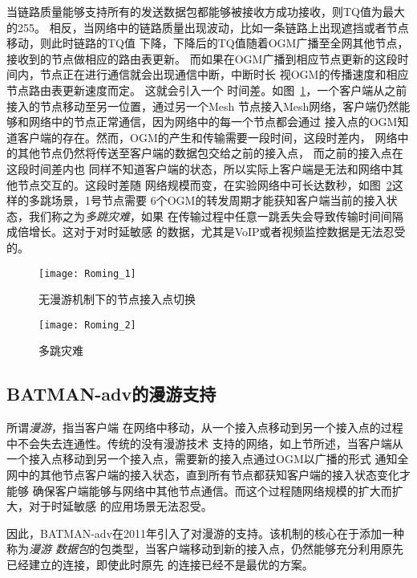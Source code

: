 当链路质量能够支持所有的发送数据包都能够被接收方成功接收，则TQ值为最大的255。
相反，当网络中的链路质量出现波动，比如一条链路上出现遮挡或者节点移动，则此时链路的TQ值
下降，下降后的TQ值随着OGM广播至全网其他节点，接收到的节点做相应的路由表更新。
而如果在OGM广播到相应节点更新的这段时间内，节点正在进行通信就会出现通信中断，中断时长
视OGM的传播速度和相应节点路由表更新速度而定。
这就会引入一个
时间差。如图~\ref{fig:roming_1}，一个客户端从之前接入的节点移动至另一位置，通过另一个Mesh
节点接入Mesh网络，客户端仍然能够和网络中的节点正常通信，因为网络中的每一个节点都会通过
接入点的OGM知道客户端的存在。然而，OGM的产生和传输需要一段时间，这段时差内，
网络中的其他节点仍然将传送至客户端的数据包交给之前的接入点，
而之前的接入点在这段时间差内也
同样不知道客户端的状态，所以实际上客户端是无法和网络中其他节点交互的。这段时差随
网络规模而变，在实验网络中可长达数秒，如图~\ref{fig:roming_2}这样的多跳场景，1号节点需要
6个OGM的转发周期才能获知客户端当前的接入状态，我们称之为\emph{多跳灾难}，如果
在传输过程中任意一跳丢失会导致传输时间间隔成倍增长。这对于对时延敏感
的数据，尤其是VoIP或者视频监控数据是无法忍受的。

\begin{figure}[H] %
  \centering
  \texttt{[image: Roming\_1]}
  \caption{无漫游机制下的节点接入点切换}
  \label{fig:roming_1}
\end{figure}
\begin{figure}[H] %
  \centering
  \texttt{[image: Roming\_2]}
  \caption{多跳灾难}
  \label{fig:roming_2}
\end{figure}

\subsection{BATMAN-adv的漫游支持}
所谓\emph{漫游}，指当客户端
在网络中移动，从一个接入点移动到另一个接入点的过程中不会失去连通性。传统的没有漫游技术
支持的网络，如上节所述，当客户端从一个接入点移动到另一个接入点，需要新的接入点通过OGM以广播的形式
通知全网中的其他节点客户端的接入状态，直到所有节点都获知客户端的接入状态变化才能够
确保客户端能够与网络中其他节点通信。而这个过程随网络规模的扩大而扩大，对于时延敏感
的应用场景无法忍受。

因此，BATMAN-adv在2011年引入了对漫游的支持。该机制的核心在于添加一种称为\emph{漫游
数据包}的包类型，当客户端移动到新的接入点，仍然能够充分利用原先已经建立的连接，即使此时原先
的连接已经不是最优的方案。

